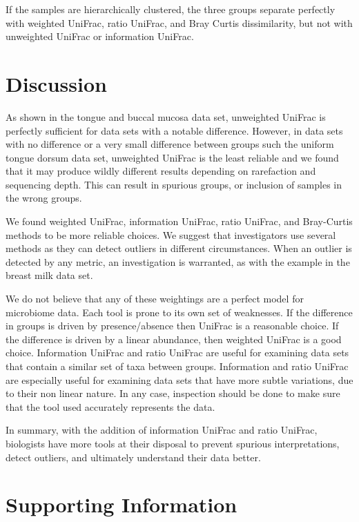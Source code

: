 \documentclass[10pt,letterpaper]{article}
\begin{document}
If the samples are hierarchically clustered, the three groups separate perfectly with weighted UniFrac, ratio UniFrac, and  Bray Curtis dissimilarity, but not with unweighted UniFrac or information UniFrac.

\FloatBarrier

\section*{Discussion}
As shown in the tongue and buccal mucosa data set, unweighted UniFrac is perfectly sufficient for data sets with a notable difference. However, in data sets with no difference or a very small difference between groups such the uniform tongue dorsum data set, unweighted UniFrac is the least reliable and we found that it may produce wildly different results depending on rarefaction and sequencing depth. This can result in spurious groups, or inclusion of samples in the wrong groups.

We found weighted UniFrac, information UniFrac, ratio UniFrac, and Bray-Curtis methods to be more reliable choices. We suggest that investigators use several methods as they can detect outliers in different circumstances. When an outlier is detected by any metric, an investigation is warranted, as with the example in the breast milk data set.

We do not believe that any of these weightings are a perfect model for microbiome data. Each tool is prone to its own set of weaknesses. If the difference in groups is driven by presence/absence then UniFrac is a reasonable choice. If the difference is driven by a linear abundance, then weighted UniFrac is a good choice. Information UniFrac and ratio UniFrac are useful for examining data sets that contain a similar set of taxa between groups. Information and ratio UniFrac are especially useful for examining data sets that have more subtle variations, due to their non linear nature. In any case, inspection should be done to make sure that the tool used accurately represents the data.

In summary, with the addition of information UniFrac and ratio UniFrac, biologists have more tools at their disposal to prevent spurious interpretations, detect outliers, and ultimately understand their data better.

\section*{Supporting Information}
\end{document}
